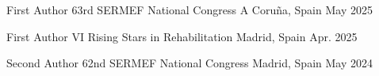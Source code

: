 

\begin{cventries}

  \cventry
    {First Author} %
    {63rd SERMEF National Congress} %
    {A Coruña, Spain} %
    {May 2025} %
    {}

  \cventry
    {First Author} %
    {VI Rising Stars in Rehabilitation} %
    {Madrid, Spain} %
    {Apr. 2025} %
    {}

  \cventry
    {Second Author} %
    {62nd SERMEF National Congress} %
    {Madrid, Spain} %
    {May 2024} %
    {}

\end{cventries}
